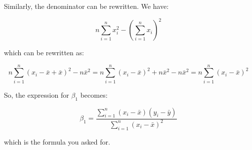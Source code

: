 \documentclass[12pt,a4paper, brazil]{article}
\begin{document}
Similarly, the denominator can be rewritten. We have:

\[
n \sum_{i=1}^{n} x_i^2 - (\sum_{i=1}^{n} x_i)^2
\]

which can be rewritten as:

\[
n \sum_{i=1}^{n} (x_i - \bar{x} + \bar{x})^2 - n \bar{x}^2
= n \sum_{i=1}^{n} (x_i - \bar{x})^2 + n \bar{x}^2 - n \bar{x}^2
= n \sum_{i=1}^{n} (x_i - \bar{x})^2
\]

So, the expression for \(\beta_1\) becomes:

\[
\beta_1 = \frac{\sum_{i=1}^{n} (x_i - \bar{x})(y_i - \bar{y})}{\sum_{i=1}^{n} (x_i - \bar{x})^2}
\]

which is the formula you asked for.

\printbibliography
\end{document}
